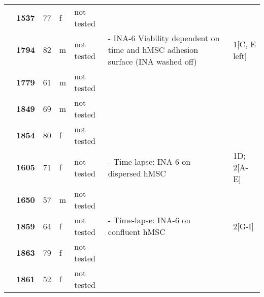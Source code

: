 {\begin{longtable}{|>{\bfseries}p{1.5cm}|>{\bfseries}p{1.2cm}|p{1cm}|p{1cm}|p{2.3cm}|p{6cm}|p{1.7cm}|}
        \hhline{~----~~}
                          & 1537  & 77 & f & not tested &                                                                                                          &                                         \\
        \hhline{~------}
                          & 1794  & 82 & m & not tested & - INA-6 Viability dependent on time and hMSC adhesion surface (INA washed off)                           & 1[C, E left]                            \\
        \hhline{~----~~}
                          & 1779  & 61 & m & not tested &                                                                                                          &                                         \\
        \hhline{~----~~}
                          & 1849  & 69 & m & not tested &                                                                                                          &                                         \\
        \hhline{~----~~}
                          & 1854  & 80 & f & not tested &                                                                                                          &                                         \\
        \hhline{~------}
                          & 1605  & 71 & f & not tested & - Time-lapse: INA-6 on dispersed hMSC                                                                    & 1D; 2[A-E]                              \\
        \hhline{~----~~}
                          & 1650  & 57 & m & not tested &                                                                                                          &                                         \\
        \hhline{~------}
                          & 1859  & 64 & f & not tested & - Time-lapse: INA-6 on confluent hMSC                                                                    & 2[G-I]                                  \\
        \hhline{~----~~}
                          & 1863  & 79 & f & not tested &                                                                                                          &                                         \\
        \hhline{~----~~}
                          & 1861  & 52 & f & not tested &                                                                                                          &                                         \\

\end{longtable}}
